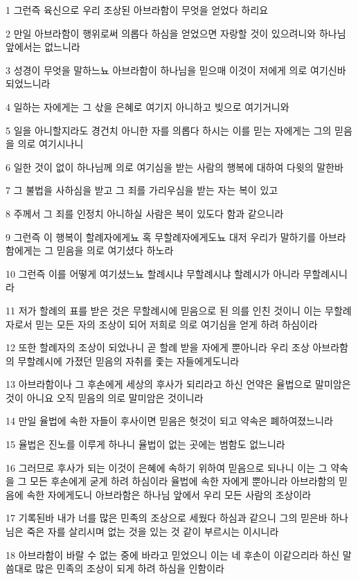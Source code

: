 \par 1 그런즉 육신으로 우리 조상된 아브라함이 무엇을 얻었다 하리요
\par 2 만일 아브라함이 행위로써 의롭다 하심을 얻었으면 자랑할 것이 있으려니와 하나님 앞에서는 없느니라
\par 3 성경이 무엇을 말하느뇨 아브라함이 하나님을 믿으매 이것이 저에게 의로 여기신바 되었느니라
\par 4 일하는 자에게는 그 삯을 은혜로 여기지 아니하고 빚으로 여기거니와
\par 5 일을 아니할지라도 경건치 아니한 자를 의롭다 하시는 이를 믿는 자에게는 그의 믿음을 의로 여기시나니
\par 6 일한 것이 없이 하나님께 의로 여기심을 받는 사람의 행복에 대하여 다윗의 말한바
\par 7 그 불법을 사하심을 받고 그 죄를 가리우심을 받는 자는 복이 있고
\par 8 주께서 그 죄를 인정치 아니하실 사람은 복이 있도다 함과 같으니라
\par 9 그런즉 이 행복이 할례자에게뇨 혹 무할례자에게도뇨 대저 우리가 말하기를 아브라함에게는 그 믿음을 의로 여기셨다 하노라
\par 10 그런즉 이를 어떻게 여기셨느뇨 할례시냐 무할례시냐 할례시가 아니라 무할례시니라
\par 11 저가 할례의 표를 받은 것은 무할례시에 믿음으로 된 의를 인친 것이니 이는 무할례자로서 믿는 모든 자의 조상이 되어 저희로 의로 여기심을 얻게 하려 하심이라
\par 12 또한 할례자의 조상이 되었나니 곧 할례 받을 자에게 뿐아니라 우리 조상 아브라함의 무할례시에 가졌던 믿음의 자취를 좇는 자들에게도니라
\par 13 아브라함이나 그 후손에게 세상의 후사가 되리라고 하신 언약은 율법으로 말미암은 것이 아니요 오직 믿음의 의로 말미암은 것이니라
\par 14 만일 율법에 속한 자들이 후사이면 믿음은 헛것이 되고 약속은 폐하여졌느니라
\par 15 율법은 진노를 이루게 하나니 율법이 없는 곳에는 범함도 없느니라
\par 16 그러므로 후사가 되는 이것이 은혜에 속하기 위하여 믿음으로 되나니 이는 그 약속을 그 모든 후손에게 굳게 하려 하심이라 율법에 속한 자에게 뿐아니라 아브라함의 믿음에 속한 자에게도니 아브라함은 하나님 앞에서 우리 모든 사람의 조상이라
\par 17 기록된바 내가 너를 많은 민족의 조상으로 세웠다 하심과 같으니 그의 믿은바 하나님은 죽은 자를 살리시며 없는 것을 있는 것 같이 부르시는 이시니라
\par 18 아브라함이 바랄 수 없는 중에 바라고 믿었으니 이는 네 후손이 이같으리라 하신 말씀대로 많은 민족의 조상이 되게 하려 하심을 인함이라
